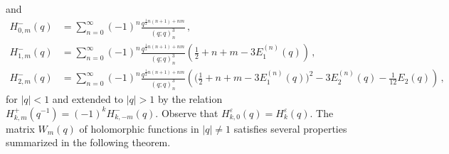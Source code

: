 \documentclass[12pt,reqno]{amsart}
\theoremstyle{definition}
\def\v{\varepsilon}
\def\diag{\mathrm{diag}}
\begin{document}
and
\begin{subequations}
\begin{align}
\label{Hn0m}
  H^-_{0,m}(q)
  &=\sum_{n=0}^\infty (-1)^n\frac{q^{\frac{1}{2}n(n+1)+nm}}{(q;q)_n^3}\,,
\\
\label{Hn1m}
  H^-_{1,m}(q)
  &=\sum_{n=0}^\infty (-1)^n\frac{q^{\frac{1}{2}n(n+1)+nm}}{(q;q)_n^3}
    \left(\frac{1}{2}+n+m-3E_1^{(n)}(q)\right) \,,
  \\
  \label{Hn2m}
  H^-_{2,m}(q)
  &=\sum_{n=0}^\infty (-1)^n\frac{q^{\frac{1}{2}n(n+1)+nm}}{(q;q)_n^3}
  \left(\big(\frac{1}{2}+n+m-3E_1^{(n)}(q)\big)^2-3E_2^{(n)}(q)
    -\frac{1}{12}E_2(q)\right) \,,
\end{align}
\end{subequations}
%
for $|q|<1$ and extended to $|q|>1$ by the relation
$H^+_{k,m}(q^{-1}) = (-1)^k H^-_{k,-m}(q)$.  Observe that
$H^\v_{k,0}(q)=H^\v_{k}(q)$.
The matrix $W_m(q)$ of holomorphic functions in $|q| \neq 1$ satisfies
several properties summarized in the following theorem.
\end{document}
